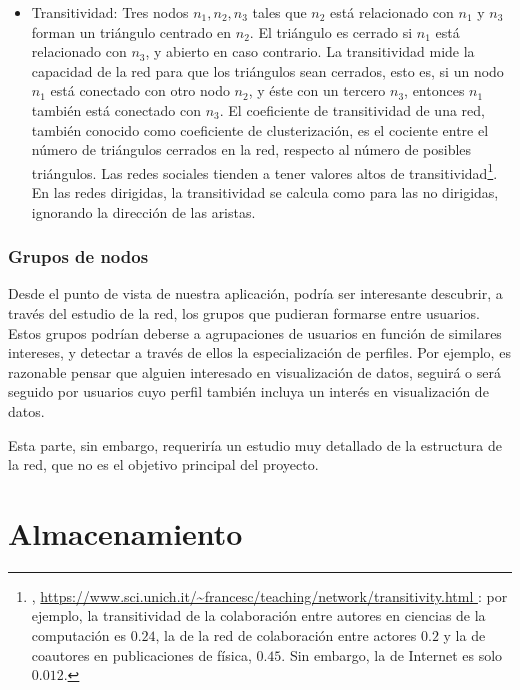 \begin{itemize}
\item Transitividad: Tres nodos $n_1, n_2, n_3$ tales que $n_2$ está relacionado con $n_1$ y $n_3$ forman un triángulo centrado en $n_2$.
El triángulo es cerrado si $n_1$ está relacionado con $n_3$, y abierto en caso contrario. La
transitividad mide la capacidad de la red para que los triángulos sean cerrados, esto es,
si un nodo $n_1$ está conectado
con otro nodo $n_2$, y éste con un tercero $n_3$, entonces $n_1$ también está conectado
con $n_3$.  
El coeficiente de transitividad de una red, también conocido
como coeficiente de clusterización, es el cociente entre el número de triángulos 
cerrados en la red, respecto al número de posibles triángulos. Las redes sociales
tienden a tener valores altos de transitividad\footnote{\cite{notas_fernando}, \url{https://www.sci.unich.it/~francesc/teaching/network/transitivity.html }:
por ejemplo, la transitividad de la colaboración entre autores en ciencias
de la computación es $0.24$, la de la red de colaboración entre actores
$0.2$ y la de coautores en publicaciones de física, $0.45$. Sin embargo,
la de Internet es solo $0.012$.}.
En las redes dirigidas, la transitividad se calcula como para las no dirigidas,
ignorando la dirección de las aristas.
\end{itemize}


\subsubsection{Grupos de nodos}
Desde el punto de vista de nuestra aplicación, podría ser interesante
descubrir, a través del estudio de la red, los grupos que pudieran formarse
entre usuarios. Estos grupos podrían deberse a agrupaciones de usuarios en
función de similares intereses, y detectar a través de ellos la especialización
de perfiles. Por ejemplo, es razonable pensar que alguien interesado en visualización
de datos, seguirá o será seguido por usuarios cuyo perfil también incluya un
interés en visualización de datos. 

Esta parte, sin embargo, requeriría un estudio muy detallado de la estructura
de la red, que no es el objetivo principal del proyecto.

\section{Almacenamiento}


